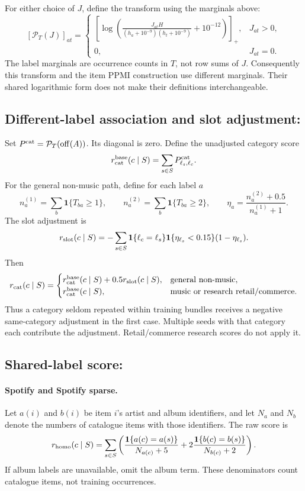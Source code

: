 \documentclass[11pt,a4paper]{article}
\newcommand{\pos}[1]{\left[#1\right]_{+}}
\newcommand{\off}{\operatorname{off}}
\DeclareRobustCommand{\key}[1]{\texttt{\detokenize{#1}}}
\newcommand{\ind}{\mathbf 1}
\begin{document}
For either choice of $J$, define the transform using the marginals above:
\begin{equation}\label{eq:catpmi}
 [\mathcal P_T(J)]_{at}=
 \begin{cases}
 \displaystyle\pos{\log\!\left(\frac{J_{at}H}
 {(h_a+10^{-9})(h_t+10^{-9})}+10^{-12}\right)},&J_{at}>0,\\
 0,&J_{at}=0.
 \end{cases}
\end{equation}
The label marginals are occurrence counts in $T$, not row sums of $J$.
Consequently this transform and the item PPMI construction use different
marginals. Their shared logarithmic form does not make their definitions
interchangeable.

\subsection{Different-label association and slot adjustment: \key{cat}}
Set $P^{\rm cat}=\mathcal P_T(\off(A))$. Its diagonal is zero.
Define the unadjusted category score
\[
 r_{\rm cat}^{\rm base}(c\mid S)=\sum_{s\in S}P^{\rm cat}_{\ell_s,\ell_c}.
\]
For the general non-music path, define for each label $a$
\[
 n_a^{(1)}=\sum_b\ind\{T_{ba}\ge1\},\qquad
 n_a^{(2)}=\sum_b\ind\{T_{ba}\ge2\},\qquad
 \eta_a=\frac{n_a^{(2)}+0.5}{n_a^{(1)}+1}.
\]
The slot adjustment is
\[
 r_{\rm slot}(c\mid S)=-\sum_{s\in S}
 \ind\{\ell_c=\ell_s\}\ind\{\eta_{\ell_s}<0.15\}(1-\eta_{\ell_s}).
\]
Then
\begin{equation}
 r_{\rm cat}(c\mid S)=
 \begin{cases}
 r_{\rm cat}^{\rm base}(c\mid S)+0.5r_{\rm slot}(c\mid S),&\text{general non-music},\\
 r_{\rm cat}^{\rm base}(c\mid S),&\text{music or research retail/commerce}.
 \end{cases}
\end{equation}
Thus a category seldom repeated within training bundles receives a negative
same-category adjustment in the first case. Multiple seeds with that category
each contribute the adjustment. Retail/commerce research scores do not apply it.

\subsection{Shared-label score: \key{homo}}
\paragraph{Spotify and Spotify sparse.}
Let $a(i)$ and $b(i)$ be item $i$'s artist and album identifiers, and let
$N_a$ and $N_b$ denote the numbers of catalogue items with those identifiers.
The raw score is
\begin{equation}
 r_{\rm homo}(c\mid S)=\sum_{s\in S}
 \left(\frac{\ind\{a(c)=a(s)\}}{N_{a(c)}+5}
 +2\frac{\ind\{b(c)=b(s)\}}{N_{b(c)}+2}\right).
\end{equation}
If album labels are unavailable, omit the album term. These denominators count
catalogue items, not training occurrences.
\end{document}
